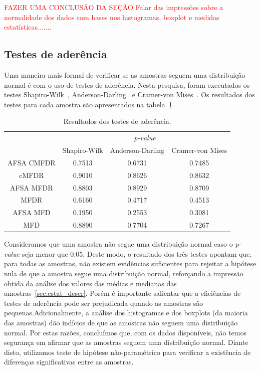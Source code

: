 \documentclass[conference]{IEEEtran}
\begin{document}
\textcolor{red}{FAZER UMA CONCLUSÃO DA SEÇÃO
Falar das impressões sobre a normalidade dos dados com bases nos histogramas, boxplot e medidas estatísticas.......}

\subsection{Testes de aderência}

Uma maneira mais formal de verificar se as amostras seguem uma distribuição normal é com o uso de testes de aderência. Nesta pesquisa, foram executados os testes Shapiro-Wilk~\cite{shapiro1965analysis}, Anderson-Darling~\cite{anderson1954test} e Cramer-von Mises~\cite{durbin1972components}. Os resultados dos testes para cada amostra são apresentados na tabela~\ref{tab:aderencia}.

\begin{table}[h]
	\centering
	\caption{Resultados dos testes de aderência.}
	\label{tab:aderencia}
	\begin{tabular}{c|ccc}
		\hline
		& \multicolumn{3}{c}{\textit{p-value}}      \\
		\cline{2-4}
		& Shapiro-Wilk & Anderson-Darling  & Cramer-von Mises\\
		\hline
		AFSA CMFDR  	& 0.7513       & 0.6731           & 0.7485 \\
		cMFDR 				 & 0.9010       & 0.8626          & 0.8632 \\
		AFSA MFDR  		 & 0.8803       & 0.8929          & 0.8709 \\
		MFDR  				 & 0.6160       & 0.4717            & 0.4513 \\
		AFSA MFD   		  & 0.1950       &  0.2553          & 0.3081 \\
		MFD   				  & 0.8890       &  0.7704          & 0.7267 \\
		\hline
	\end{tabular}
\end{table}

Consideramos que uma amostra não segue uma distribuição normal caso o \textit{p-value} seja menor que 0.05. Deste modo, o resultado dos três testes apontam que, para todas as amostras, não existem evidências suficientes para rejeitar a hipótese nula de que a amostra segue uma distribuição normal, reforçando a impressão obtida da análise dos valores das médias e medianas das amostras~\ref{sec:estat_descr}. Porém é importante salientar que a eficiências de testes de aderência pode ser prejudicada quando as amostras são pequenas.Adicionalmente, a análise dos histogramas e dos boxplots (da maioria das amostras) dão indícios de que as amostras não seguem uma distribuição normal. Por estas razões, concluímos que, com os dados disponíveis, não temos segurança em afirmar que as amostras seguem uma distribuição normal. Diante disto, utilizamos teste de hipótese não-paramétrico para verificar a existência de diferenças significativas entre as amostras.
\end{document}
